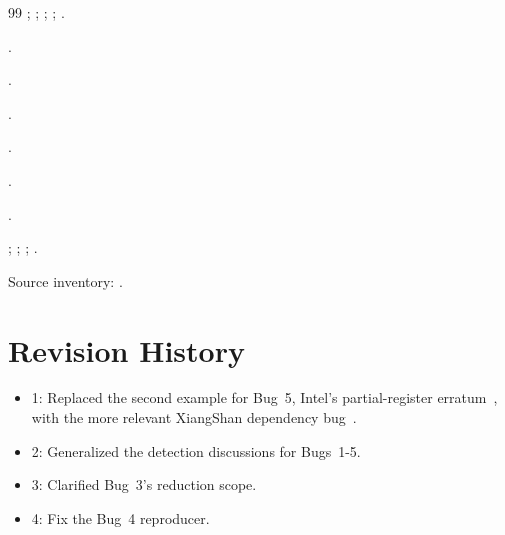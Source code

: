\documentclass[conference]{IEEEtran}
\begin{document}
\begin{thebibliography}{99}
\href{run:../src/bug4/formal/results/logs/anvil_compile_buggy.log}{};
\href{run:../src/bug4/formal/results/logs/anvil_compile_semantic_bug.log}{};
\href{run:../src/bug4/formal/results/logs/anvil_compile_fixed.log}{};
\href{run:../src/bug4/formal/results/logs/anvil_semantic_bug.log}{};
\href{run:../src/bug4/formal/results/logs/anvil_fixed.log}{}.

\href{run:../src/bug5/rtl/buggy.sv}{}.

\href{run:../src/bug5/rtl/fixed.sv}{}.

\href{run:../src/bug5/rtl/buggy.anvil}{}.

\href{run:../src/bug5/rtl/fixed.anvil}{}.

\href{run:../src/bug5/tb/tb.sv}{}.

\href{run:../src/bug5/formal/properties.sv}{}.

\href{run:../src/bug5/formal/results/logs/anvil_compile_buggy.log}{};
\href{run:../src/bug5/formal/results/logs/anvil_compile_fixed.log}{};
\href{run:../src/bug5/formal/results/logs/anvil_buggy.log}{};
\href{run:../src/bug5/formal/results/logs/anvil_fixed.log}{}.

Source inventory:
\href{run:sources.txt}{}.
\end{thebibliography}

\section*{Revision History}

\begin{itemize}
  \item 1: Replaced the second example for Bug~5, Intel's partial-register
  erratum~\cite{intel-errata}, with the more relevant XiangShan dependency
  bug~\cite{xiangshan-vl-bug,xiangshan-vl-fix}.
  \item 2: Generalized the detection discussions for Bugs~1-5.
  \item 3: Clarified Bug~3's reduction scope.
  \item 4: Fix the Bug~4 reproducer.
\end{itemize}
\end{document}
